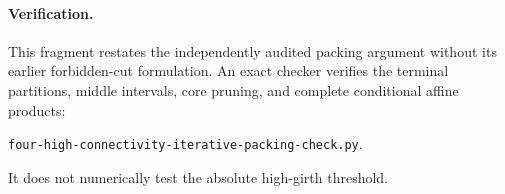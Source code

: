 \paragraph{Verification.}
This fragment restates the independently audited packing argument without its earlier forbidden-cut formulation.
An exact checker verifies the terminal partitions, middle intervals, core pruning, and complete conditional affine products:
\begin{center}
\small\nolinkurl{four-high-connectivity-iterative-packing-check.py}.
\end{center}
It does not numerically test the absolute high-girth threshold.
